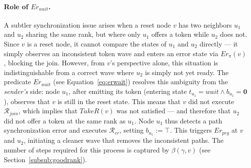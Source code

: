 \documentclass[a4paper, 12pt]{article}
\newcommand{\bz}{\mathbf{0}}
\newcommand{\Rer}{$\mathscr{R}_{er}$}
\newcommand{\Rjoin}{$\mathscr{R}_{join}$}
\begin{document}
\paragraph{Role of $Er_{wait}$.}
A subtler synchronization issue arises when a reset node $v$ has two 
neighbors $u_1$ and $u_2$ sharing the same rank, but where only $u_1$ 
offers a token while $u_2$ does not. Since $v$ is a reset node, it 
cannot compare the states of $u_1$ and $u_2$ directly — it simply 
observes an inconsistent token wave and enters an error state via 
$Er_\pi(v)$, blocking the join. However, from $v$'s perspective alone, 
this situation is indistinguishable from a correct wave where $u_2$ is 
simply not yet ready. The predicate $Er_{wait}$ (see 
Equation~\ref{eq:erwait}) resolves this ambiguity from the \emph{sender's} 
side: node $u_1$, after emitting its token (entering state 
$t_{u_1} = \mathit{wait} \wedge b_{u_1} = \bz$), observes that $v$ is 
still in the reset state. This means that $v$ did not execute \Rjoin, 
which implies that $\mathit{TakeR}(v)$ was not satisfied — and therefore 
that $u_2$ did not offer a token at the same rank as $u_1$. Node $u_1$ 
thus detects a path synchronization error and executes \Rer, setting 
$b_{u_1} := \top$. This triggers $Er_{prg}$ at $v$ and $u_2$, 
initiating a cleaner wave that removes the inconsistent paths. The number 
of steps required for this process is captured by $\beta(\gamma, v)$ (see 
Section~\ref{subsub:goodrank}).
\end{document}

